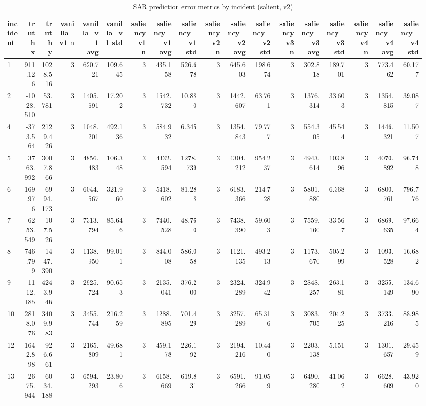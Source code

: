 \begin{table}[ht]
\centering
\caption{SAR prediction error metrics by incident (salient, v2)}
\label{tab:sar-incident-errors-salient,-v2}
\begin{tabular}{lrrrrrrrrrrrrrrrrr}
\hline
incident & truth x & truth y & vanilla\_v1 n & vanilla\_v1 avg & vanilla\_v1 std & saliency\_v1 n & saliency\_v1 avg & saliency\_v1 std & saliency\_v2 n & saliency\_v2 avg & saliency\_v2 std & saliency\_v3 n & saliency\_v3 avg & saliency\_v3 std & saliency\_v4 n & saliency\_v4 avg & saliency\_v4 std \\
\hline
1 & 911.126 & 1028.516 & 3 & 620.721 & 109.645 & 3 & 435.158 & 526.678 & 3 & 645.603 & 198.674 & 3 & 302.818 & 189.701 & 3 & 773.462 & 60.177 \\
2 & -1028.510 & 53.781 & 3 & 1405.691 & 17.202 & 3 & 1542.732 & 10.880 & 3 & 1442.607 & 63.761 & 3 & 1376.314 & 33.603 & 3 & 1354.815 & 39.087 \\
4 & -373.564 & 2129.426 & 3 & 1048.201 & 492.136 & 3 & 584.932 & 6.345 & 3 & 1354.843 & 79.777 & 3 & 554.305 & 45.544 & 3 & 1446.321 & 11.507 \\
5 & -3763.992 & 3007.866 & 3 & 4856.483 & 106.348 & 3 & 4332.594 & 1278.739 & 3 & 4304.212 & 954.237 & 3 & 4943.614 & 103.896 & 3 & 4070.892 & 96.748 \\
6 & 169.976 & -6994.173 & 3 & 6044.567 & 321.960 & 3 & 5418.602 & 81.288 & 3 & 6183.366 & 214.728 & 3 & 5801.880 & 6.368 & 3 & 6800.761 & 796.776 \\
7 & -6253.549 & -107.526 & 3 & 7313.794 & 85.646 & 3 & 7440.528 & 48.760 & 3 & 7438.390 & 59.603 & 3 & 7559.160 & 33.567 & 3 & 6869.635 & 97.664 \\
8 & 746.799 & -1447.390 & 3 & 1138.950 & 99.011 & 3 & 844.008 & 586.058 & 3 & 1121.135 & 493.213 & 3 & 1173.670 & 505.299 & 3 & 1093.528 & 16.682 \\
9 & -1112.185 & 4243.946 & 3 & 2925.724 & 90.653 & 3 & 2135.041 & 376.200 & 3 & 2324.289 & 324.942 & 3 & 2848.257 & 263.181 & 3 & 3255.149 & 134.690 \\
10 & 2818.076 & 3409.983 & 3 & 3455.744 & 216.259 & 3 & 1288.895 & 701.429 & 3 & 3257.289 & 65.316 & 3 & 3083.705 & 204.225 & 3 & 3733.216 & 88.985 \\
12 & 1642.898 & -926.661 & 3 & 2165.809 & 49.681 & 3 & 459.178 & 226.192 & 3 & 2194.216 & 10.440 & 3 & 2203.138 & 5.051 & 3 & 1301.657 & 29.459 \\
13 & -2675.944 & -6034.188 & 3 & 6594.293 & 23.806 & 3 & 6158.669 & 619.831 & 3 & 6591.266 & 91.059 & 3 & 6490.280 & 41.062 & 3 & 6628.609 & 43.920 \\

\end{tabular}
\end{table}
